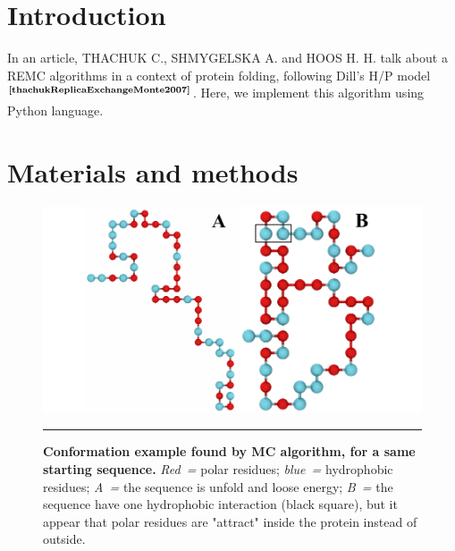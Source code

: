 \documentclass[12pt, oneside, a4paper]{report}
\newcommand{\p}[1]{$^\text{#1}$}
\newcommand{\Cite}[1]{\p{\textbf{\cite{#1}}}}
\begin{document}
\vspace{2ex}

\begin{multicols}{2}
\section{Introduction}
\vspace{-1ex}

In an article, THACHUK C., SHMYGELSKA A. and HOOS H. H. talk about a REMC algorithms in a context of protein folding, following Dill's H/P model\Cite{thachukReplicaExchangeMonte2007}. Here, we implement this algorithm using Python language.

\vspace{-2ex}

\section{Materials and methods}
\vspace{-1ex}

\begin{figure}[!b]
    \includegraphics[width=\textwidth]{figure/conformation_example.pdf}
    
    \small
    \vspace{0.5ex}
    \hrule height 1pt

    \caption{
        \textbf{Conformation example found by MC algorithm, for a same starting sequence.} \textit{Red~=} polar residues; \textit{blue~=} hydrophobic residues; \textit{A~=} the sequence is unfold and loose energy; \textit{B~=} the sequence have one hydrophobic interaction (black square), but it appear that polar residues are "attract" inside the protein instead of outside.
        \label{f:conformation_example}}
\end{figure}


\end{multicols}
\end{document}
